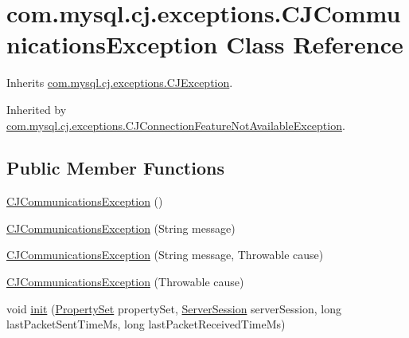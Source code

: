 \hypertarget{classcom_1_1mysql_1_1cj_1_1exceptions_1_1_c_j_communications_exception}{}\section{com.\+mysql.\+cj.\+exceptions.\+C\+J\+Communications\+Exception Class Reference}
\label{classcom_1_1mysql_1_1cj_1_1exceptions_1_1_c_j_communications_exception}


Inherits \mbox{\hyperlink{classcom_1_1mysql_1_1cj_1_1exceptions_1_1_c_j_exception}{com.\+mysql.\+cj.\+exceptions.\+C\+J\+Exception}}.



Inherited by \mbox{\hyperlink{classcom_1_1mysql_1_1cj_1_1exceptions_1_1_c_j_connection_feature_not_available_exception}{com.\+mysql.\+cj.\+exceptions.\+C\+J\+Connection\+Feature\+Not\+Available\+Exception}}.

\subsection*{Public Member Functions}
\begin{DoxyCompactItemize}
\item 
\mbox{\hyperlink{classcom_1_1mysql_1_1cj_1_1exceptions_1_1_c_j_communications_exception_ae09c3748819c4e5361dfaeaa1cb14f9b}{C\+J\+Communications\+Exception}} ()
\item 
\mbox{\hyperlink{classcom_1_1mysql_1_1cj_1_1exceptions_1_1_c_j_communications_exception_a623873673d9823008cbca292ae86b4f0}{C\+J\+Communications\+Exception}} (String message)
\item 
\mbox{\hyperlink{classcom_1_1mysql_1_1cj_1_1exceptions_1_1_c_j_communications_exception_aa23238c40518f1c816cc78c8257f47ac}{C\+J\+Communications\+Exception}} (String message, Throwable cause)
\item 
\mbox{\hyperlink{classcom_1_1mysql_1_1cj_1_1exceptions_1_1_c_j_communications_exception_a71694859bdad328921da71773ac7feb4}{C\+J\+Communications\+Exception}} (Throwable cause)
\item 
void \mbox{\hyperlink{classcom_1_1mysql_1_1cj_1_1exceptions_1_1_c_j_communications_exception_a95119012fe117d5a433a2f25e373b806}{init}} (\mbox{\hyperlink{interfacecom_1_1mysql_1_1cj_1_1conf_1_1_property_set}{Property\+Set}} property\+Set, \mbox{\hyperlink{interfacecom_1_1mysql_1_1cj_1_1protocol_1_1_server_session}{Server\+Session}} server\+Session, long last\+Packet\+Sent\+Time\+Ms, long last\+Packet\+Received\+Time\+Ms)
\end{DoxyCompactItemize}
